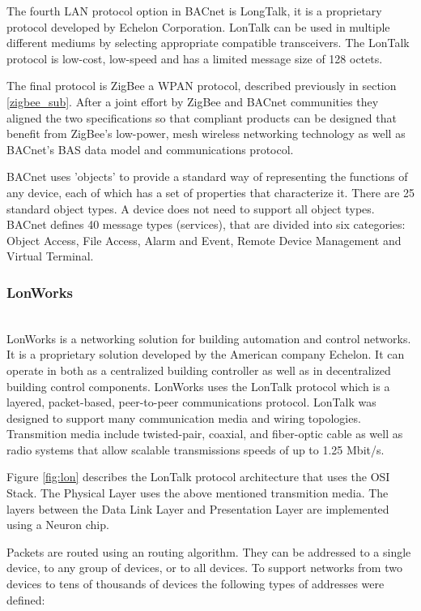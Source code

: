 The fourth LAN protocol option in BACnet is LongTalk, it is a proprietary protocol developed by Echelon Corporation. LonTalk can be used in multiple different mediums by selecting appropriate compatible transceivers. The LonTalk protocol is low-cost, low-speed and has a limited message size of 128 octets.


The final protocol is ZigBee a WPAN protocol, described previously in section \ref{zigbee_sub}. After a joint effort by ZigBee and BACnet communities they aligned the two specifications\cite{bacnet_zig} so that compliant products can be designed that benefit from ZigBee's low-power, mesh wireless networking technology as well as BACnet's BAS data model and communications protocol.



BACnet uses 'objects' to provide a standard way of representing the functions of any device, each of which has a set of properties that characterize it. There are 25 standard object types. A device does not need to support all object types. 
BACnet defines 40 message types (services), that are divided into six categories: Object Access, File Access, Alarm and Event, Remote Device Management and Virtual Terminal.




\subsubsection{LonWorks}\mbox{}\\

LonWorks \cite{livro_automation2,livro_automation} is a networking solution for building automation and control networks. It is a proprietary solution developed by the American company Echelon. It can operate in both as a centralized building controller as well as in decentralized building control components.
LonWorks uses the LonTalk protocol which is a layered, packet-based, peer-to-peer communications protocol. LonTalk was designed to support many communication media and wiring topologies. Transmition media include twisted-pair, coaxial, and fiber-optic cable as well as radio systems that allow scalable transmissions speeds of up to 1.25 Mbit/s.

Figure \ref{fig:lon} describes the  LonTalk protocol architecture that uses the OSI Stack. The Physical Layer uses the above mentioned transmition media. The layers between the Data Link Layer and Presentation Layer are implemented using a Neuron chip.

Packets are routed using an routing algorithm. They can be addressed to a single device, to any group of devices, or to all devices. To support networks from two devices to tens of thousands of devices
the following types of addresses were defined:


